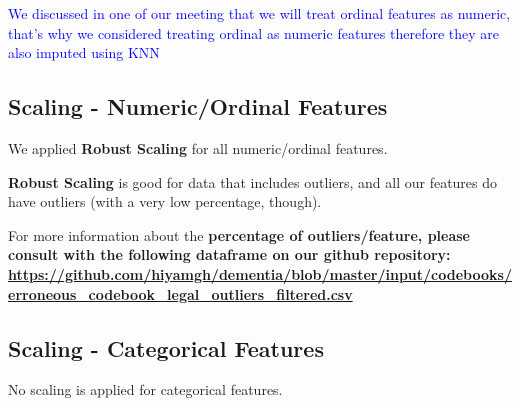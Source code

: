 \documentclass{article}
\begin{document}
\noindent \textcolor{blue}{We discussed in one of our meeting that we will treat ordinal features as numeric, that's why we considered treating ordinal as numeric features therefore they are also imputed using KNN}

\subsection{Scaling - Numeric/Ordinal Features}
We applied \textbf{Robust Scaling} for all numeric/ordinal features.

\noindent \textbf{Robust Scaling} is good for data that includes outliers, and all our features do have outliers (with a very low percentage, though). 

\noindent For more information about the \textbf{percentage of outliers/feature, please consult with the following dataframe on our github repository: \url{https://github.com/hiyamgh/dementia/blob/master/input/codebooks/erroneous_codebook_legal_outliers_filtered.csv}}

\subsection{Scaling - Categorical Features}
No scaling is applied for categorical features.



\end{document}
